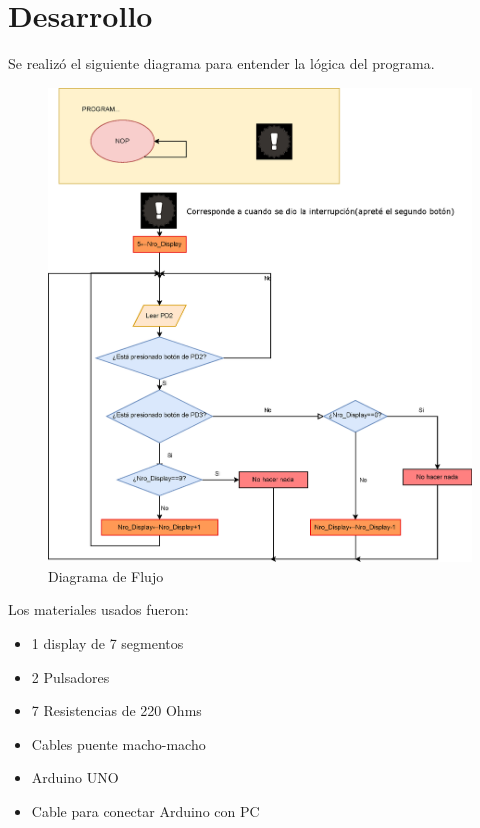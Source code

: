 \section{Desarrollo}\label{sec:desarrollo}

Se realizó el siguiente diagrama para entender la lógica del programa.

\begin{figure}[H]
    \centering
    \includegraphics[width=\linewidth]{imagenes/tp2.eps}
    \caption{Diagrama de Flujo}
    \label{fig:CIRCRECT1}
\end{figure}

Los materiales usados fueron: 

\begin{itemize}
    \item 1 display de 7 segmentos
    \item 2 Pulsadores
    \item 7 Resistencias de 220 Ohms
    \item Cables puente macho-macho
    \item Arduino UNO
    \item Cable para conectar Arduino con PC
\end{itemize}

